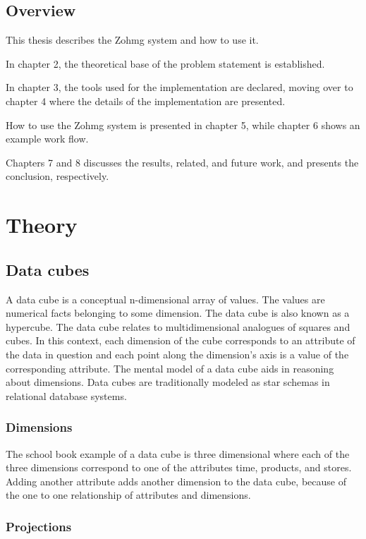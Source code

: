 \documentclass[a4paper,10pt]{book}
\begin{document}
\section{Overview}

This thesis describes the Zohmg system and how to use it.

In chapter 2, the theoretical base of the problem statement is established.

In chapter 3, the tools used for the implementation are declared, moving
over to chapter 4 where the details of the implementation are presented.

How to use the Zohmg system is presented in chapter 5, while chapter 6
shows an example work flow.

Chapters 7 and 8 discusses the results, related, and future work, and
presents the conclusion, respectively.




\chapter{Theory}

\section{Data cubes}

A data cube is a conceptual n-dimensional array of values. The values are
numerical facts belonging to some dimension. The data cube is also known as a
hypercube. The data cube relates to multidimensional analogues of squares and cubes.
In this context, each dimension of the cube corresponds to an attribute of
the data in question and each point along the dimension's axis is a value of
the corresponding attribute. The mental model of a data cube aids in
reasoning about dimensions. Data cubes are traditionally modeled as star
schemas in relational database systems. \cite{olap_solutions}


\subsection{Dimensions}

The school book example of a data cube is three dimensional where each of
the three dimensions correspond to one of the attributes time, products,
and stores. Adding another attribute adds another dimension to the data
cube, because of the one to one relationship of attributes and dimensions.


\subsection{Projections}
\end{document}
